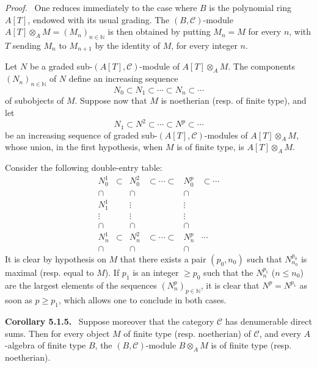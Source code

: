 \documentclass[11pt]{article}
\newenvironment{statement}[1]{\par\medskip\noindent\textbf{#1.}\ }{\par\medskip}
\newenvironment{prooftext}[1][Proof]{\par\noindent\emph{#1.}\ }{\par\medskip}
\begin{document}
\begin{prooftext}
One reduces immediately to the case where \(B\) is the polynomial ring \(A[T]\), endowed with its usual grading. The \((B,\mathcal C)\)-module \(A[T]\otimes_A M=(M_n)_{n\in\mathbb N}\) is then obtained by putting \(M_n=M\) for every \(n\), with \(T\) sending \(M_n\) to \(M_{n+1}\) by the identity of \(M\), for every integer \(n\).

Let \(N\) be a graded sub-\((A[T],\mathcal C)\)-module of \(A[T]\otimes_A M\). The components \((N_n)_{n\in\mathbb N}\) of \(N\) define an increasing sequence
\[
N_0\subset N_1\subset\cdots\subset N_n\subset\cdots
\]
of subobjects of \(M\). Suppose now that \(M\) is noetherian (resp. of finite type), and let
\[
N_1\subset N^2\subset\cdots\subset N^p\subset\cdots
\]
be an increasing sequence of graded sub-\((A[T],\mathcal C)\)-modules of \(A[T]\otimes_A M\), whose union, in the first hypothesis, when \(M\) is of finite type, is \(A[T]\otimes_A M\).

Consider the following double-entry table:
\[
\begin{array}{cccccc}
N_0^1&\subset&N_0^2&\subset\cdots\subset&N_0^p&\subset\cdots\\
\cap&&\cap&&\cap\\
N_1^1&&\vdots&&\vdots\\
\vdots&&\vdots&&\vdots\\
\cap&&\cap&&\cap\\
N_n^1&\subset&N_n^2&\subset\cdots\subset&N_n^p&\cdots\\
\cap&&\cap&&\cap
\end{array}
\]
It is clear by hypothesis on \(M\) that there exists a pair \((p_0,n_0)\) such that \(N^{p_0}_{n_0}\) is maximal (resp. equal to \(M\)). If \(p_1\) is an integer \(\ge p_0\) such that the \(N_n^{p_1}\) (\(n\le n_0\)) are the largest elements of the sequences \((N_n^p)_{p\in\mathbb N}\), it is clear that \(N^p=N^{p_1}\) as soon as \(p\ge p_1\), which allows one to conclude in both cases.
\end{prooftext}

\begin{statement}{Corollary 5.1.5}
Suppose moreover that the category \(\mathcal C\) has denumerable direct sums. Then for every object \(M\) of finite type (resp. noetherian) of \(\mathcal C\), and every \(A\)-algebra of finite type \(B\), the \((B,\mathcal C)\)-module \(B\otimes_A M\) is of finite type (resp. noetherian).
\end{statement}
\end{document}
